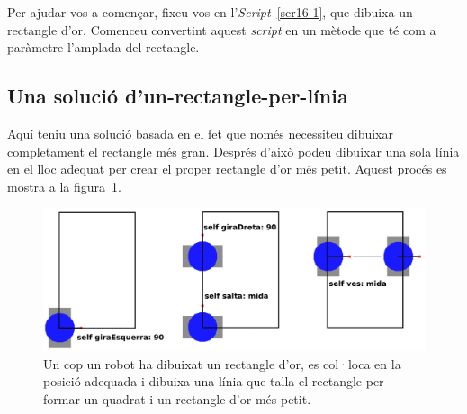Per ajudar-vos a començar, fixeu-vos en l'\emph{Script}~\ref{scr16-1}, que dibuixa un rectangle d'or. Comenceu convertint aquest \emph{script} en un mètode que té com a paràmetre l'amplada del rectangle.

\subsection{Una solució d'un-rectangle-per-línia}
Aquí teniu una solució basada en el fet que només necessiteu dibuixar completament el rectangle més gran. Després d'això podeu dibuixar una sola línia en el lloc adequat per crear el proper rectangle d'or més petit. Aquest procés es mostra a la figura~\ref{fig1604}.
\begin{figure}[h!]
\begin{center}
\includegraphics[scale=0.225]{Imatges/figura16-4.pdf}
\end{center}
\caption{Un cop un robot ha dibuixat un rectangle d'or, es col·loca en la posició adequada i dibuixa una línia que talla el rectangle per formar un quadrat i un rectangle d'or més petit.}
\label{fig1604}
\end{figure}

